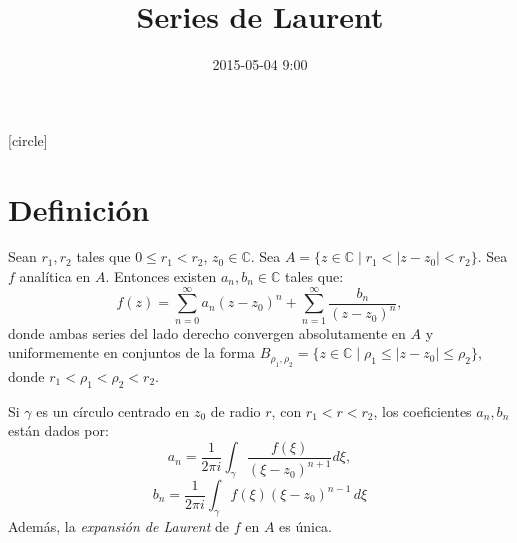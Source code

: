 \documentclass[spanish,presentation]{beamer}
\date{2015-05-04 9:00}
\title{Series de Laurent}
\begin{document}
\maketitle
{}
[circle]

\tableofcontents

\section{Definición}
\label{orgheadline1}

\begin{frame}[label=sec-1-1]{}
\begin{theorem}
Sean \(r_{1},r_{2}\) tales que \(0\leq r_{1}<r_{2}\), \(z_{0}\in
    \mathbb{C}\). Sea \(A=\{z\in \mathbb{C}\mid
    r_{1}<|z-z_{0}|<r_{2}\}\). Sea \(f\) analítica en \(A\). Entonces
existen \(a_{n},b_{n}\in \mathbb{C}\) tales que:
\begin{displaymath}
f(z)=\sum_{n=0}^{\infty}a_{n}(z-z_{0})^{n}+\sum_{n=1}^{\infty}\frac{b_{n}}{(z-z_{0})^{n}},
\end{displaymath}
donde ambas series del lado derecho convergen absolutamente en
\(A\) y uniformemente en conjuntos de la forma
\(B_{\rho_{1},\rho_{2}}=\{z\in \mathbb{C}\mid
    \rho_{1}\leq|z-z_{0}|\leq\rho_{2}\}\), donde
\(r_{1}<\rho_{1}<\rho_{2}<r_{2}\).
\end{theorem}
\end{frame}

\begin{frame}[label=sec-1-2]{}
\begin{theorem}[Continuación]
Si \(\gamma\) es un círculo centrado en \(z_{0}\) de radio \(r\),
con \(r_{1}<r<r_{2}\), los coeficientes \(a_{n},b_{n}\) están
dados por:
\begin{displaymath}
a_{n}=\frac{1}{2\pi i}\int_{\gamma}\frac{f(\xi)}{(\xi-z_{0})^{n+1}}d\xi,
\end{displaymath}
\begin{displaymath}
b_{n}=\frac{1}{2\pi i}\int_{\gamma}f(\xi)(\xi-z_{0})^{n-1}\,d\xi
\end{displaymath}
Además, la \emph{expansión de Laurent} de \(f\) en \(A\) es única.
\end{theorem}
\end{frame}

\section{}
\label{orgheadline1}
\end{document}
